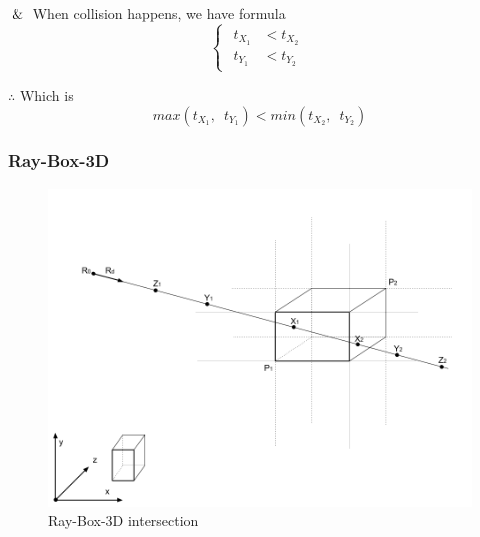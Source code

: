 $\And$ When collision happens,  we have formula
\[
\left\{
\begin{array}{lr}
\begin{aligned}
t_{X_1} &< t_{X_2} \\
t_{Y_1} &< t_{Y_2}
\end{aligned}
\end{array}
\right.
\]

$\therefore$ Which is
\begin{equation}
\label{equ:ray-box-2d-intersection}
max(t_{X_1},\enspace t_{Y_1}) < min(t_{X_2},\enspace t_{Y_2})
\end{equation}

\subsubsection{Ray-Box-3D}

\begin{figure}[H]
\caption[ray-box-3d-intersection]{Ray-Box-3D intersection}
\label{fig:ray-box-3d}
\centering
\includegraphics[width=\linewidth]{Figures/ray-box-3d-intersection.png}
\decoRule
\end{figure}

